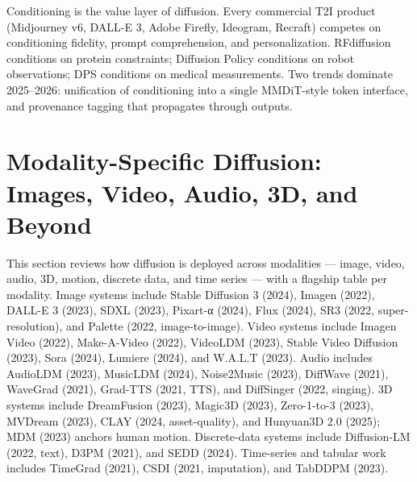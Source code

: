 \documentclass{article}
\begin{document}
Conditioning is the value layer of diffusion. Every commercial T2I product (Midjourney v6, DALL-E 3, Adobe Firefly, Ideogram, Recraft) competes on conditioning fidelity, prompt comprehension, and personalization. RFdiffusion conditions on protein constraints; Diffusion Policy conditions on robot observations; DPS conditions on medical measurements. Two trends dominate 2025--2026: unification of conditioning into a single MMDiT-style token interface, and provenance tagging that propagates through outputs.

\section{Modality-Specific Diffusion: Images, Video, Audio, 3D, and Beyond}\label{modality-specific-diffusion-images-video-audio-3d-and-beyond}

This section reviews how diffusion is deployed across modalities --- image, video, audio, 3D, motion, discrete data, and time series --- with a flagship table per modality. Image systems include Stable Diffusion 3 (2024), Imagen (2022), DALL-E 3 (2023), SDXL (2023), Pixart-α (2024), Flux (2024), SR3 (2022, super-resolution), and Palette (2022, image-to-image). Video systems include Imagen Video (2022), Make-A-Video (2022), VideoLDM (2023), Stable Video Diffusion (2023), Sora (2024), Lumiere (2024), and W.A.L.T (2023). Audio includes AudioLDM (2023), MusicLDM (2024), Noise2Music (2023), DiffWave (2021), WaveGrad (2021), Grad-TTS (2021, TTS), and DiffSinger (2022, singing). 3D systems include DreamFusion (2023), Magic3D (2023), Zero-1-to-3 (2023), MVDream (2023), CLAY (2024, asset-quality), and Hunyuan3D 2.0 (2025); MDM (2023) anchors human motion. Discrete-data systems include Diffusion-LM (2022, text), D3PM (2021), and SEDD (2024). Time-series and tabular work includes TimeGrad (2021), CSDI (2021, imputation), and TabDDPM (2023).
\end{document}

